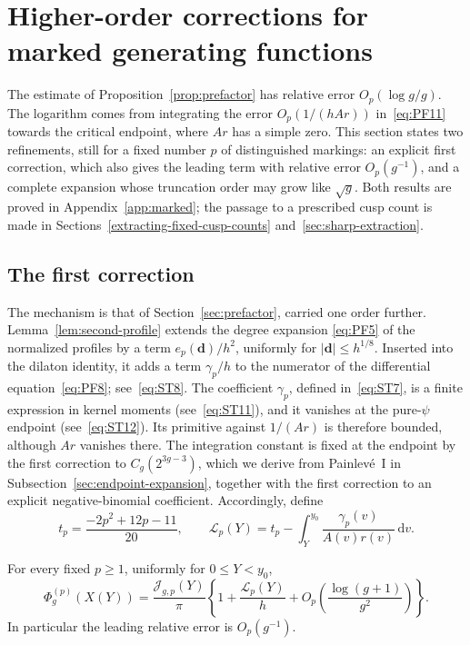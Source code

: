 \section{Higher-order corrections for marked generating functions}\label{sec:higher-order}

The estimate of Proposition~\ref{prop:prefactor} has relative error
$O_p(\log g/g)$. The logarithm comes from integrating the error
$O_p(1/(hAr))$ in~\eqref{eq:PF11} towards the critical endpoint, where
$Ar$ has a simple zero. This section states two refinements, still for a
fixed number $p$ of distinguished markings: an explicit first correction,
which also gives the leading term with relative error $O_p(g^{-1})$, and a
complete expansion whose truncation order may grow like $\sqrt g$. Both
results are proved in Appendix~\ref{app:marked}; the passage to a
prescribed cusp count is made in
Sections~\ref{extracting-fixed-cusp-counts} and~\ref{sec:sharp-extraction}.

\subsection{The first correction}\label{subsec:first-correction}
The mechanism is that of Section~\ref{sec:prefactor}, carried one order
further. Lemma~\ref{lem:second-profile} extends the degree expansion
\eqref{eq:PF5} of the normalized profiles by a term $e_p(\mathbf d)/h^2$,
uniformly for $|\mathbf d|\le h^{1/8}$. Inserted into the dilaton identity,
it adds a term $\gamma_p/h$ to the numerator of the differential
equation~\eqref{eq:PF8}; see~\eqref{eq:ST8}. The coefficient $\gamma_p$,
defined in~\eqref{eq:ST7}, is a finite expression in kernel moments
(see~\eqref{eq:ST11}), and it vanishes at the pure-$\psi$ endpoint
(see~\eqref{eq:ST12}). Its primitive against $1/(Ar)$ is therefore bounded,
although $Ar$ vanishes there. The integration constant is fixed at the
endpoint by the first correction to $C_g(2^{3g-3})$, which we derive from
Painlev\'e~I in Subsection~\ref{sec:endpoint-expansion}, together with
the first correction to an explicit negative-binomial coefficient.
Accordingly, define
\begin{equation}
 t_p=\frac{-2p^2+12p-11}{20},\qquad
 \mathcal L_p(Y)=t_p-\int_Y^{y_0}\frac{\gamma_p(v)}{A(v)r(v)}\,\mathrm{d}v.
 \label{eq:ST13}
\end{equation}

\begin{theorem}\label{thm:first-correction}
For every fixed $p\ge1$, uniformly for $0\le Y<y_0$,
\begin{equation}
 \Phi_g^{(p)}(X(Y))=\frac{\mathcal J_{g,p}(Y)}\pi
 \left\{1+\frac{\mathcal L_p(Y)}h+
            O_p\!\left(\frac{\log(g+1)}{g^2}\right)\right\}.
 \label{eq:ST14}
\end{equation}
In particular the leading relative error is $O_p(g^{-1})$.
\end{theorem}


